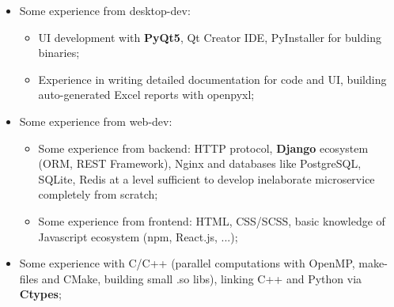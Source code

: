 \documentclass[12pt,a4paper]{moderncv}
\begin{document}
{\begin{itemize}
\begin{itemize}
        \item Work skills with \textbf{Pandas} and sklearn, experience with GPFlow, \textbf{GPy} for work with Gaussian Processes, \textbf{botorch} for Bayesian optimization, gradient boosting with \textbf{CatBoost};\newline
        \item Advanced work with \textbf{LaTeX} for scientific texts and presentations; \newline
    \end{itemize} 
\item Some experience from desktop-dev:\newline
    \begin{itemize}
        \item UI development with \textbf{PyQt5}, Qt Creator IDE, PyInstaller for bulding binaries; \newline
        \item Experience in writing detailed documentation for code and UI, building auto-generated Excel reports with openpyxl; \newline
    \end{itemize}
\item Some experience from web-dev: \newline
    \begin{itemize}
        \item Some experience from backend: 
          HTTP protocol, \textbf{Django} ecosystem (ORM, REST Framework), Nginx and databases like PostgreSQL, SQLite, Redis at a level
          sufficient to develop inelaborate microservice completely from scratch;\newline
        \item Some experience from frontend: 
          HTML, CSS/SCSS, basic knowledge of Javascript ecosystem (npm, React.js, ...); \newline
    \end{itemize}
\item Some experience with C/C++ (parallel computations with OpenMP, make-files and CMake, building small .so libs), linking C++ and Python via \textbf{Ctypes}; \newline \newline
\end{itemize}
}{}{}{}{}
\end{document}
